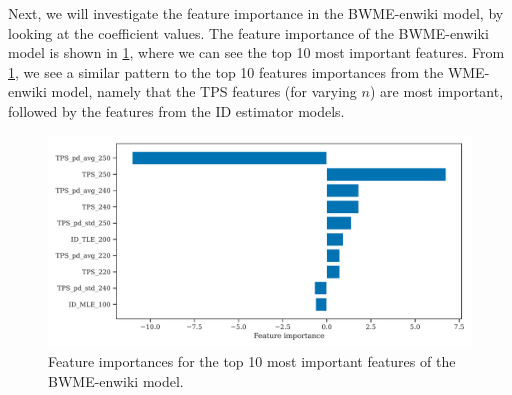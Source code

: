 Next, we will investigate the feature importance in the BWME-enwiki model, by looking at the coefficient values. The feature importance of the BWME-enwiki model is shown in \cref{fig:bwme-enwiki-feature-importances}, where we can see the top 10 most important features. From \cref{fig:bwme-enwiki-feature-importances}, we see a similar pattern to the top 10 features importances from the WME-enwiki model, namely that the TPS features (for varying $n$) are most important, followed by the features from the ID estimator models.
\begin{figure}[H]
    \centering
    \includegraphics[width=\textwidth]{thesis/figures/bwme-enwiki-top-10-feature-importances.pdf}
    \caption{Feature importances for the top 10 most important features of the BWME-enwiki model.}
    \label{fig:bwme-enwiki-feature-importances}
\end{figure}

